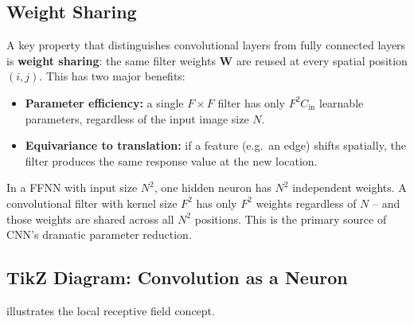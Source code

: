 \documentclass[12pt,a4paper]{article}
\begin{document}
\subsection{Weight Sharing}
\label{subsec:weight_sharing}

A key property that distinguishes convolutional layers from fully connected
layers is \textbf{weight sharing}: the same filter weights $\mathbf{W}$ are
reused at every spatial position $(i,j)$.  This has two major benefits:

\begin{itemize}[leftmargin=2em]
  \item \textbf{Parameter efficiency:} a single $F\times F$ filter has only
        $F^2 C_{\text{in}}$ learnable parameters, regardless of the input
        image size $N$.
  \item \textbf{Equivariance to translation:} if a feature (e.g.\ an edge)
        shifts spatially, the filter produces the same response value at the
        new location.
\end{itemize}

\begin{keyinsight}[title=Key Insight: Weight Sharing]
In a FFNN with input size $N^2$, one hidden neuron has $N^2$ independent
weights.  A convolutional filter with kernel size $F^2$ has only $F^2$
weights regardless of $N$ -- and those weights are shared across all $N^2$
positions.  This is the primary source of CNN's dramatic parameter reduction.
\end{keyinsight}

\subsection{TikZ Diagram: Convolution as a Neuron}
\label{subsec:conv_diagram}

 illustrates the local receptive field concept.
\end{document}
